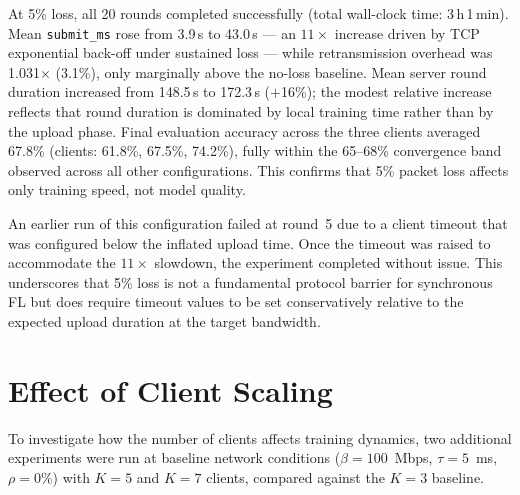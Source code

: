 \documentclass[12pt,a4paper]{report}
\begin{document}
At 5\% loss, all 20 rounds completed successfully (total wall-clock time:
3\,h\,1\,min).  Mean \texttt{submit\_ms} rose from 3.9\,s to 43.0\,s
--- an $11\times$ increase driven by TCP exponential back-off under
sustained loss --- while retransmission overhead was 1.031$\times$
(3.1\%), only marginally above the no-loss baseline.  Mean server round
duration increased from 148.5\,s to 172.3\,s ($+$16\%); the modest
relative increase reflects that round duration is dominated by local
training time rather than by the upload phase.  Final evaluation accuracy
across the three clients averaged 67.8\% (clients: 61.8\%, 67.5\%,
74.2\%), fully within the 65--68\% convergence band observed across all
other configurations.  This confirms that 5\% packet loss affects only
training speed, not model quality.

An earlier run of this configuration failed at round~5 due to a client
timeout that was configured below the inflated upload time.  Once the
timeout was raised to accommodate the $11\times$ slowdown, the experiment
completed without issue.  This underscores that 5\% loss is not a
fundamental protocol barrier for synchronous FL but does require
timeout values to be set conservatively relative to the expected upload
duration at the target bandwidth.

\section{Effect of Client Scaling}
\label{sec:scale_results}

To investigate how the number of clients affects training dynamics, two
additional experiments were run at baseline network conditions
($\beta = 100$~Mbps, $\tau = 5$~ms, $\rho = 0\%$) with $K = 5$ and
$K = 7$ clients, compared against the $K = 3$ baseline.
\end{document}
